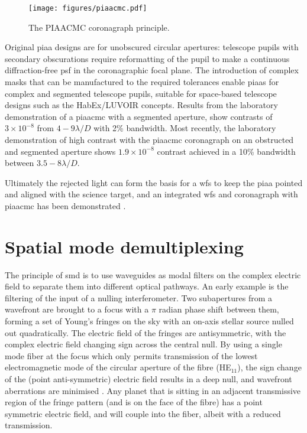 \documentclass[letterpaper]{ar-1col}
\newcommand{\ld}{$\lambda/D$}
\begin{document}
\begin{figure}[ht]
  \centering
  \texttt{[image: figures/piaacmc.pdf]}
  \caption{The PIAACMC coronagraph principle.}
  \label{fig:piaatypes}
\end{figure}

%
Original \ac{piaa} designs are for unobscured circular apertures: telescope pupils with secondary obscurations require reformatting of the pupil to make a continuous diffraction-free \ac{psf} in the coronagraphic focal plane.
%
The introduction of complex masks that can be manufactured to the required tolerances enable \ac{piaa}s for complex and segmented telescope pupils, suitable for space-based telescope designs such as the HabEx/LUVOIR concepts.
%
Results from the laboratory demonstration of a \ac{piaacmc} with a segmented aperture, \citet{Marx21} show contrasts of $3\times 10^{-8}$ from $4-9$\ld{} with 2\% bandwidth.
%
Most recently, the laboratory demonstration of high contrast with the \ac{piaacmc} coronagraph on an obstructed and segmented aperture \citep{Belikov22} shows $1.9\times 10^{-8}$ contrast achieved in a 10\% bandwidth between $3.5-8$\ld{}.

Ultimately the rejected light can form the basis for a \ac{wfs} to keep the \ac{piaa} pointed and aligned with the science target, and an integrated \ac{wfs} and coronagraph with \ac{piaacmc} has been demonstrated \citep{Haffert23a}.


\section{Spatial mode demultiplexing}

The principle of \ac{smd} is to use waveguides as modal filters on the complex electric field to separate them into different optical pathways.
%
An early example is the filtering of the input of a nulling interferometer.
%
Two subapertures from a wavefront are brought to a focus with a $\pi$ radian phase shift between them, forming a set of Young's fringes on the sky with an on-axis stellar source nulled out quadratically.
%
The electric field of the fringes are antisymmetric, with the complex electric field changing sign across the central null.
%
By using a single mode fiber at the focus  which only permits transmission of the lowest electromagnetic mode of the circular aperture of the fibre (HE$_{11}$), the sign change of the (point anti-symmetric) electric field results in a deep null, and wavefront aberrations are minimised \citet{Serabyn06,Haguenauer06}.
%
Any planet that is sitting in an adjacent transmissive region of the fringe pattern (and is on the face of the fibre) has a point symmetric electric field, and will couple into the fiber, albeit with a reduced transmission.
\end{document}
